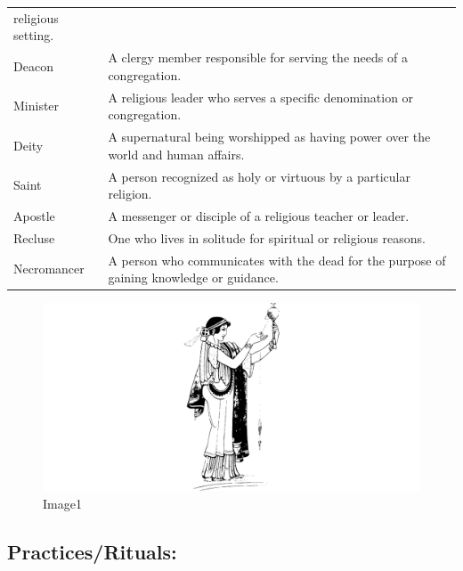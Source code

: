 \begin{longtable}[]{@{}
  >{\raggedright\arraybackslash}p{}
  >{\raggedright\arraybackslash}p{}@{}}
religious setting. \\
Deacon & A clergy member responsible for serving the needs of a
congregation. \\
Minister & A religious leader who serves a specific denomination or
congregation. \\
Deity & A supernatural being worshipped as having power over the world
and human affairs. \\
Saint & A person recognized as holy or virtuous by a particular
religion. \\
Apostle & A messenger or disciple of a religious teacher or leader. \\
Recluse & One who lives in solitude for spiritual or religious
reasons. \\
Necromancer & A person who communicates with the dead for the purpose of
gaining knowledge or guidance. \\
\bottomrule
\end{longtable}

\begin{figure}
\centering
\includegraphics{./images/religion02.pdf}
\caption{Image1}
\end{figure}

\hypertarget{practicesrituals}{%
\subsection{Practices/Rituals:}\label{practicesrituals}}

